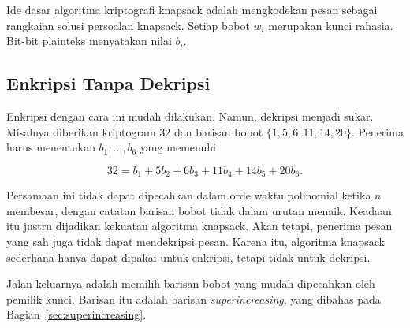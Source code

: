 Ide dasar algoritma kriptografi knapsack adalah mengkodekan pesan sebagai
rangkaian solusi persoalan knapsack. Setiap bobot $w_i$ merupakan kunci rahasia.
Bit-bit plainteks menyatakan nilai $b_i$.

\subsection{Enkripsi Tanpa Dekripsi}

Enkripsi dengan cara ini mudah dilakukan. Namun, dekripsi menjadi sukar.
Misalnya diberikan kriptogram $32$ dan barisan bobot
$\{1, 5, 6, 11, 14, 20\}$. Penerima harus menentukan $b_1, \dots, b_6$ yang
memenuhi

\begin{equation}
32 = b_1 + 5b_2 + 6b_3 + 11b_4 + 14b_5 + 20b_6 .
\label{eq:knapsack-32}
\end{equation}

Persamaan ini tidak dapat dipecahkan dalam orde waktu polinomial ketika $n$
membesar, dengan catatan barisan bobot tidak dalam urutan menaik. Keadaan itu
justru dijadikan kekuatan algoritma knapsack. Akan tetapi, penerima pesan yang
sah juga tidak dapat mendekripsi pesan. Karena itu, algoritma knapsack sederhana
hanya dapat dipakai untuk enkripsi, tetapi tidak untuk dekripsi.

Jalan keluarnya adalah memilih barisan bobot yang mudah dipecahkan oleh pemilik
kunci. Barisan itu adalah barisan \textit{superincreasing}, yang dibahas pada
Bagian~\ref{sec:superincreasing}.
